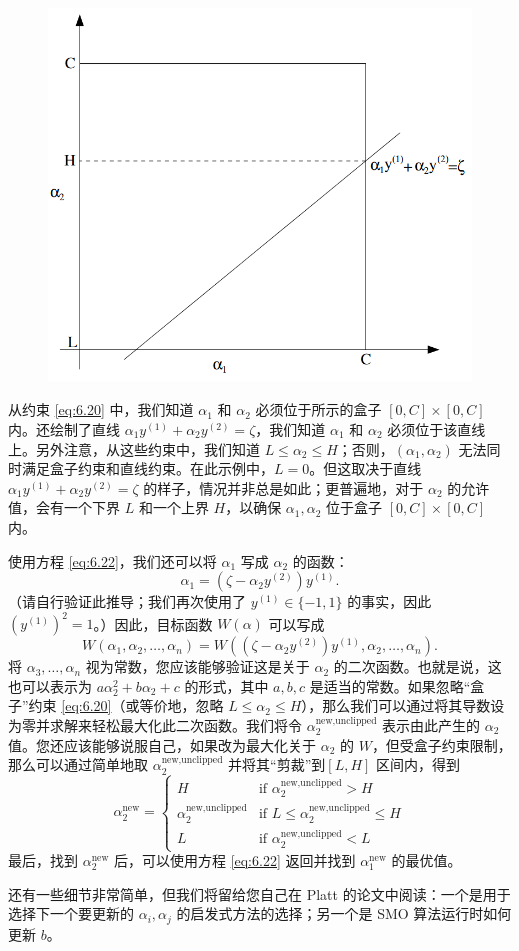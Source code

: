 \begin{figure}[H]
    \centering
    \includegraphics[width=0.5\linewidth]{figs/svm_smo_constraint.png}
\end{figure}

从约束 \eqref{eq:6.20} 中，我们知道 $\alpha_1$ 和 $\alpha_2$ 必须位于所示的盒子 $[0, C] \times [0, C]$ 内。还绘制了直线 $\alpha_1 y^{(1)} + \alpha_2 y^{(2)} = \zeta$，我们知道 $\alpha_1$ 和 $\alpha_2$ 必须位于该直线上。另外注意，从这些约束中，我们知道 $L \le \alpha_2 \le H$；否则，$(\alpha_1, \alpha_2)$ 无法同时满足盒子约束和直线约束。在此示例中，$L=0$。但这取决于直线 $\alpha_1 y^{(1)} + \alpha_2 y^{(2)} = \zeta$ 的样子，情况并非总是如此；更普遍地，对于 $\alpha_2$ 的允许值，会有一个下界 $L$ 和一个上界 $H$，以确保 $\alpha_1, \alpha_2$ 位于盒子 $[0, C] \times [0, C]$ 内。

使用方程 \eqref{eq:6.22}，我们还可以将 $\alpha_1$ 写成 $\alpha_2$ 的函数：
\[
    \alpha_1 = (\zeta - \alpha_2 y^{(2)}) y^{(1)}.
\]
（请自行验证此推导；我们再次使用了 $y^{(1)} \in \{-1, 1\}$ 的事实，因此 $(y^{(1)})^2 = 1$。）因此，目标函数 $W(\alpha)$ 可以写成
\[
    W(\alpha_1, \alpha_2, \dots, \alpha_n) = W((\zeta - \alpha_2 y^{(2)}) y^{(1)}, \alpha_2, \dots, \alpha_n).
\]
将 $\alpha_3, \dots, \alpha_n$ 视为常数，您应该能够验证这是关于 $\alpha_2$ 的二次函数。也就是说，这也可以表示为 $a\alpha_2^2 + b\alpha_2 + c$ 的形式，其中 $a, b, c$ 是适当的常数。如果忽略“盒子”约束 \eqref{eq:6.20}（或等价地，忽略 $L \le \alpha_2 \le H$），那么我们可以通过将其导数设为零并求解来轻松最大化此二次函数。我们将令 $\alpha_2^{\text{new,unclipped}}$ 表示由此产生的 $\alpha_2$ 值。您还应该能够说服自己，如果改为最大化关于 $\alpha_2$ 的 $W$，但受盒子约束限制，那么可以通过简单地取 $\alpha_2^{\text{new,unclipped}}$ 并将其“剪裁”到$[L, H]$ 区间内，得到
\[
    \alpha_2^{\text{new}} = \begin{cases}
        H & \text{if } \alpha_2^{\text{new,unclipped}} > H \\
        \alpha_2^{\text{new,unclipped}} & \text{if } L \le \alpha_2^{\text{new,unclipped}} \le H \\
        L & \text{if } \alpha_2^{\text{new,unclipped}} < L
    \end{cases}
\]
最后，找到 $\alpha_2^{\text{new}}$ 后，可以使用方程 \eqref{eq:6.22} 返回并找到 $\alpha_1^{\text{new}}$ 的最优值。

还有一些细节非常简单，但我们将留给您自己在 Platt 的论文中阅读：一个是用于选择下一个要更新的 $\alpha_i, \alpha_j$ 的启发式方法的选择；另一个是 SMO 算法运行时如何更新 $b$。